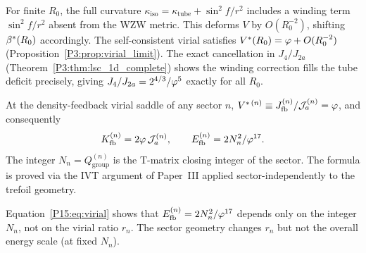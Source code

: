 \begin{remark}[2D corrections]
\label{P3:rem:2d_corrections}
For finite $R_0$, the full curvature $\kappa_{\mathrm{iso}} = \kappa_{\mathrm{tube}}
+ \sin^2\!f/r^2$ includes a winding term $\sin^2\!f/r^2$ absent from the WZW metric.
This deforms $V$ by $O(R_0^{-2})$, shifting $\beta^{*}(R_0)$ accordingly.
The self-consistent virial satisfies $V^*(R_0) = \varphi + O(R_0^{-2})$
(Proposition~\ref{P3:prop:virial_limit}).  The exact cancellation in $J_4/J_{2a}$
(Theorem~\ref{P3:thm:lsc_1d_complete}) shows the winding correction fills the tube
deficit precisely, giving $J_4/J_{2a} = 2^{4/3}/\varphi^5$ exactly for all $R_0$.
\end{remark}

\begin{theorem}
\label{P15:thm:virial}
At the density-feedback virial saddle of any sector $n$,
$V^{*\,(n)}\equiv J_{\mathrm{fb}}^{(n)}/\mathcal{J}_a^{(n)}=\varphi$,
and consequently
\begin{equation}
  K_{\mathrm{fb}}^{(n)} = 2\varphi\,\mathcal{J}_a^{(n)},
  \qquad
  E_{\mathrm{fb}}^{(n)} = 2N_n^2/\varphi^{17}.
  \label{P15:eq:virial_universal}
\end{equation}
The integer $N_n = Q_{\mathrm{group}}^{(n)}$ is the T-matrix closing
integer of the sector. The formula is proved via the IVT argument
of Paper~III applied sector-independently to the trefoil geometry.
\end{theorem}

\begin{remark}
\label{P15:rem:sector_independence_energy}
Equation~\eqref{P15:eq:virial} shows that $E_{\mathrm{fb}}^{(n)}=2N_n^2/\varphi^{17}$
depends only on the integer $N_n$, not on the virial ratio $r_n$.
The sector geometry changes $r_n$ but not the overall energy scale
(at fixed $N_n$).
\end{remark}
